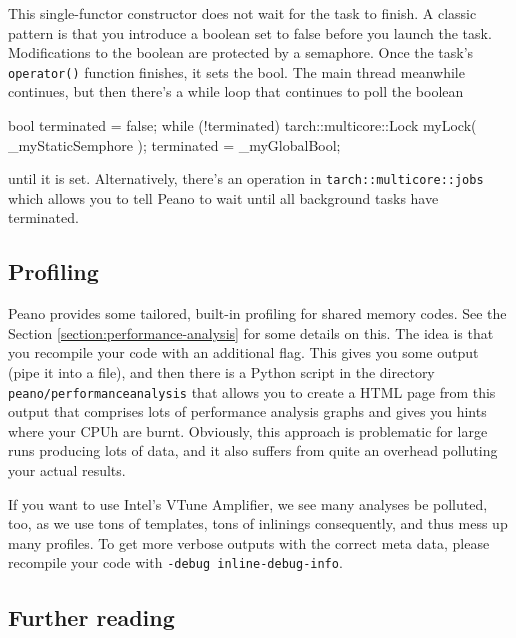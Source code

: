This single-functor constructor does not wait for the task to finish.
A classic pattern is that you introduce a boolean set to false before you launch
the task.
Modifications to the boolean are protected by a semaphore.
Once the task's \texttt{operator()} function finishes, it sets the bool.
The main thread meanwhile continues, but then there's a while loop that
continues to poll the boolean

\begin{code}
  bool terminated = false;
  while (!terminated) {
    tarch::multicore::Lock myLock( _myStaticSemphore );
    terminated = _myGlobalBool;
  }
\end{code}

\noindent
until it is set. Alternatively, there's an operation in \texttt{tarch::multicore::jobs} which 
allows you to tell Peano to wait until all background tasks have terminated.





\subsection{Profiling}

Peano provides some tailored, built-in profiling for shared memory codes. 
See the Section \ref{section:performance-analysis} for some details on this. 
The idea is that you recompile your code with an additional flag.
This gives you some output (pipe it into a file), and then there is a Python
script in the directory \texttt{peano/performanceanalysis} that allows you to
create a HTML page from this output that comprises lots of performance analysis
graphs and gives you hints where your CPUh are burnt. Obviously, this approach
is problematic for large runs producing lots of data, and it also suffers from
quite an overhead polluting your actual results.

If you want to use Intel's VTune Amplifier, we see many analyses be polluted,
too, as we use tons of templates, tons of inlinings consequently, and thus mess
up many profiles. To get more verbose outputs with the correct meta data, please
recompile your code with \texttt{-debug inline-debug-info}.


\subsection*{Further reading}

